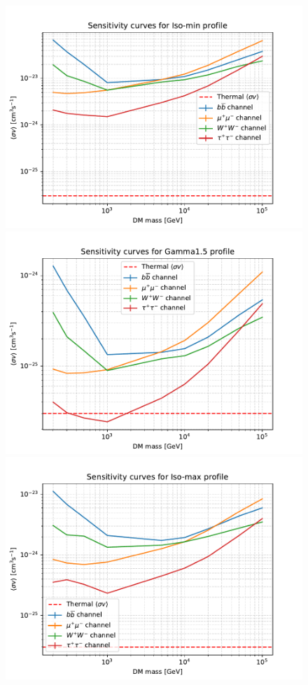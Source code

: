 \documentclass{article}
\begin{document}
\begin{figure}
\endminipage
{}
\includegraphics[width=1\textwidth]{Pictures/Limits_Iso-min.pdf}
\endminipage \\
\includegraphics[width=1\textwidth]{Pictures/Limits_Gamma1-5.pdf}
\endminipage
{}
\includegraphics[width=1\textwidth]{Pictures/Limits_Iso-max.pdf}

\end{figure}
\end{document}
